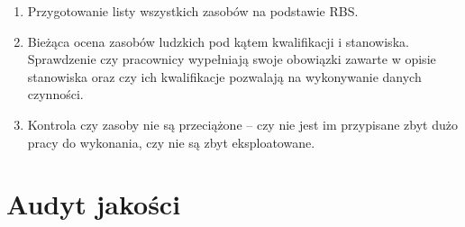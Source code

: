 \begin{enumerate}
\item	Przygotowanie listy wszystkich zasobów na podstawie RBS.
\item	Bieżąca ocena zasobów ludzkich pod kątem kwalifikacji i stanowiska.  Sprawdzenie czy pracownicy wypełniają swoje obowiązki zawarte w opisie stanowiska oraz czy ich kwalifikacje pozwalają na wykonywanie danych czynności.
\item	Kontrola czy zasoby nie są przeciążone – czy nie jest im przypisane zbyt dużo pracy do wykonania, czy nie są zbyt eksploatowane.
\end{enumerate}


\section{Audyt jakości}

